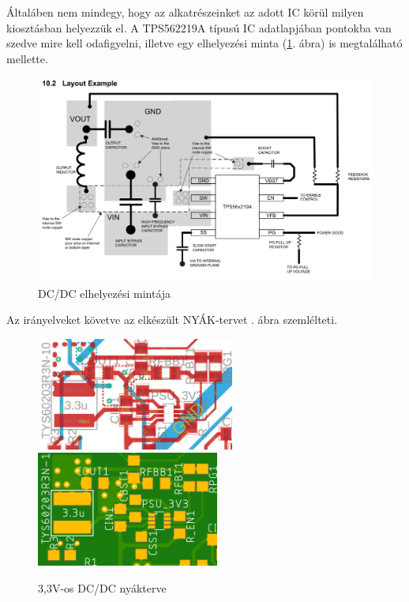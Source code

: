 \documentclass[../main.tex]{subfiles}
\begin{document}
            Általáben nem mindegy, hogy az alkatrészeinket az adott IC körül milyen kiosztásban helyezzük el. A TPS562219A típusú IC adatlapjában pontokba van szedve mire kell odafigyelni, illetve egy elhelyezési minta (\ref{fig:tps_logl_example}. ábra) is megtalálható mellette.
            
            \begin{figure}[h!]
                \centering
                    \includegraphics[width=12cm]{resources/pcb_res/tps_logl_example.png}
                \caption{DC/DC elhelyezési mintája}
                \label{fig:tps_logl_example}
            \end{figure}
            
            Az irányelveket követve az elkészült NYÁK-tervet . ábra szemlélteti.
            
            \begin{figure}[h!]
                \centering
                    \includegraphics[width=6.5cm]{resources/pcb_res/board_dcdc_3v3.png}
                    \includegraphics[width=6cm]{resources/pcb_res/pcb_dcdc_3v3.png}
                \caption{3,3V-os DC/DC nyákterve}
                \label{fig:pcb_3v3}
            \end{figure}
            
\end{document}
